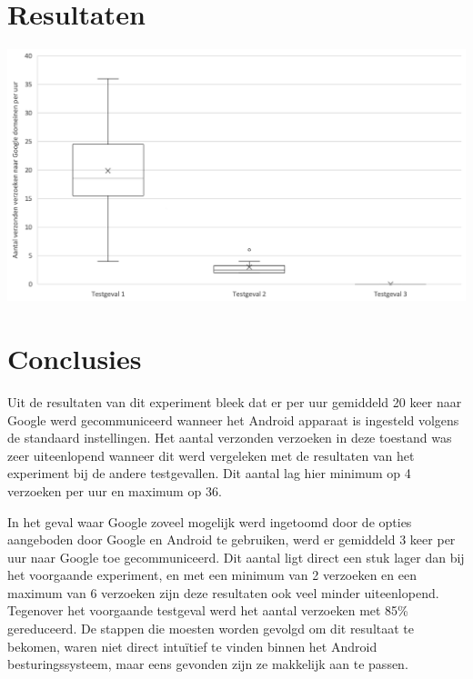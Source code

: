 \documentclass[a0,portrait]{a0poster}
\begin{document}
\begin{multicols}{2}
\vfill\null
\columnbreak

\color{HoGentAccent1} 
\section*{Resultaten}
\color{black}


\begin{center}\vspace{1cm}
\includegraphics[width=1.0\linewidth]{../bachproef/experiment/grafieken/boxplot-compare-wide.png}
\label{grafiek}
\end{center}\vspace{1cm}


\color{HoGentAccent1} 
\section*{Conclusies}
\color{black}
Uit de resultaten van dit experiment bleek dat er per uur gemiddeld 20 keer naar Google werd gecommuniceerd wanneer het Android apparaat is ingesteld volgens de standaard instellingen. Het aantal verzonden verzoeken in deze toestand was zeer uiteenlopend wanneer dit werd vergeleken met de resultaten van het experiment bij de andere testgevallen. Dit aantal lag hier minimum op 4 verzoeken per uur en maximum op 36.

In het geval waar Google zoveel mogelijk werd ingetoomd door de opties aangeboden door Google en Android te gebruiken, werd er gemiddeld 3 keer per uur naar Google toe gecommuniceerd. Dit aantal ligt direct een stuk lager dan bij het voorgaande experiment, en met een minimum van 2 verzoeken en een maximum van 6 verzoeken zijn deze resultaten ook veel minder uiteenlopend. Tegenover het voorgaande testgeval werd het aantal verzoeken met 85\% gereduceerd. De stappen die moesten worden gevolgd om dit resultaat te bekomen, waren niet direct intuïtief te vinden binnen het Android besturingssysteem, maar eens gevonden zijn ze makkelijk aan te passen.


\end{multicols}
\end{document}
